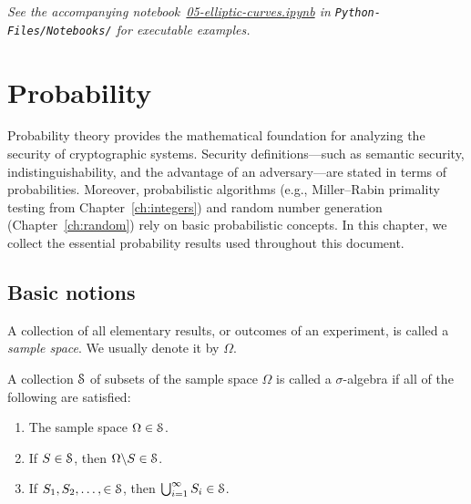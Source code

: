 \documentclass[a4paper, 12pt]{book} %
\newcommand{\notebook}[1]{\begingroup\small\itshape
    See the accompanying notebook~\href{run:./Python-Files/Notebooks/#1}{#1} in \texttt{Python-Files/Notebooks/} for executable examples.%
\endgroup}
\begin{document}
\notebook{05-elliptic-curves.ipynb}

\chapter{Probability}
\label{ch:probability}

Probability theory provides the mathematical foundation for analyzing the
security of cryptographic systems. Security definitions---such as semantic
security, indistinguishability, and the advantage of an adversary---are stated
in terms of probabilities. Moreover, probabilistic algorithms (e.g., Miller--Rabin
primality testing from Chapter~\ref{ch:integers}) and random number generation
(Chapter~\ref{ch:random}) rely on basic probabilistic concepts. In this chapter,
we collect the essential probability results used throughout this document.

\section{Basic notions}

\begin{definition}
    A collection of all elementary results, or outcomes of an experiment, is called a \emph{sample space}. We usually denote it by $\Omega$.
\end{definition}




\begin{definition}
    A collection $\EuScript{S}$ of subsets of the sample space $\Omega$ is called a $\sigma$-algebra if all of the following are satisfied:
    \begin{enumerate}
        \item The sample space $\Omega \in \EuScript{S}$.
        \item If $S \in \EuScript{S}$, then $\Omega \backslash S \in \EuScript{S}$.
        \item If $S_1, S_2, \ldots,  \in \EuScript{S}$, then $\bigcup_{i=1}^\infty S_i \in \EuScript{S}$.
    \end{enumerate}
\end{definition}
\end{document}
